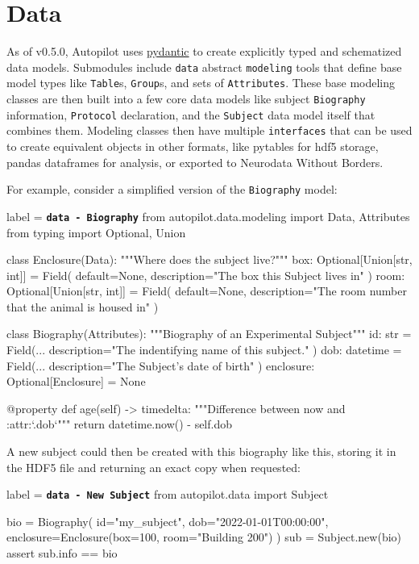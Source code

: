 \section{Data}
\label{sec:datamodel}

As of v0.5.0, Autopilot uses \href{https://pydantic-docs.helpmanual.io/}{pydantic} to create explicitly typed and schematized data models. Submodules include \texttt{data} abstract \texttt{modeling} tools that define base model types like \texttt{Table}s, \texttt{Group}s, and sets of \texttt{Attributes}. These base modeling classes are then built into a few core data models like subject \texttt{Biography} information, \texttt{Protocol} declaration, and the \texttt{Subject} data model itself that combines them. Modeling classes then have multiple \texttt{interfaces} that can be used to create equivalent objects in other formats, like pytables for hdf5 storage, pandas dataframes for analysis, or exported to Neurodata Without Borders.

For example, consider a simplified version of the \texttt{Biography} model:


\begin{pythoncode*}{label = \texttt{\textbf{data - Biography}}}
from autopilot.data.modeling import Data, Attributes
from typing import Optional, Union

class Enclosure(Data):
    """Where does the subject live?"""
    box:  Optional[Union[str, int]] = Field(
        default=None, 
        description="The box this Subject lives in"
    )
    room: Optional[Union[str, int]] = Field(
        default=None, 
        description="The room number that the animal is housed in"
    )

class Biography(Attributes):
    """Biography of an Experimental Subject"""
    id:  str = Field(...
        description="The indentifying name of this subject."
    )
    dob: datetime = Field(... 
        description="The Subject's date of birth"
    )
    enclosure: Optional[Enclosure] = None

    @property
    def age(self) -> timedelta:
        """Difference between now and :attr:`.dob`"""
        return datetime.now() - self.dob
\end{pythoncode*}

A new subject could then be created with this biography like this, storing it in the HDF5 file and returning an exact copy when requested:

\begin{pythoncode*}{label = \texttt{\textbf{data - New Subject}}}
from autopilot.data import Subject

bio = Biography(
    id="my_subject",
    dob="2022-01-01T00:00:00",
    enclosure=Enclosure(box=100, room="Building 200")
)
sub = Subject.new(bio)
assert sub.info == bio
\end{pythoncode*}

